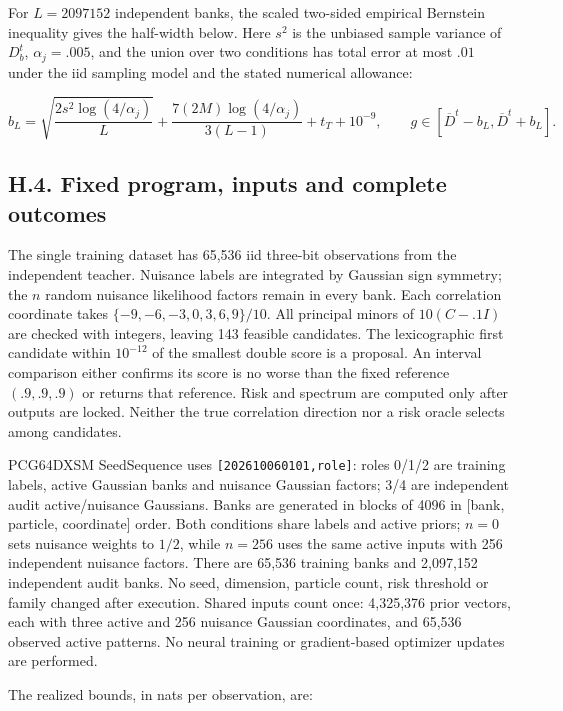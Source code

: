 \documentclass{article}
\begin{document}
For \(L=2097152\) independent banks, the scaled two-sided empirical
Bernstein inequality \citep[Theorem 4]{maurer2009} gives the half-width
below. Here \(s^2\) is the unbiased sample variance of \(D_b^t\),
\(\alpha_j=.005\), and the union over two conditions has total error at
most \(.01\) under the iid sampling model and the stated numerical
allowance:

\[
b_L=\sqrt{\frac{2s^2\log(4/\alpha_j)}{L}}
+\frac{7(2M)\log(4/\alpha_j)}{3(L-1)}+t_T+10^{-9},
\qquad g\in[\overline D^t-b_L,\overline D^t+b_L].
\tag{H.9}
\]

\subsection*{H.4. Fixed program, inputs and complete
outcomes}\label{h.4.-fixed-program-inputs-and-complete-outcomes}

The single training dataset has 65,536 iid three-bit observations from
the independent teacher. Nuisance labels are integrated by Gaussian sign
symmetry; the \(n\) random nuisance likelihood factors remain in every
bank. Each correlation coordinate takes \(\{-9,-6,-3,0,3,6,9\}/10\). All
principal minors of \(10(C-.1I)\) are checked with integers, leaving 143
feasible candidates. The lexicographic first candidate within
\(10^{-12}\) of the smallest double score is a proposal. An interval
comparison either confirms its score is no worse than the fixed
reference \((.9,.9,.9)\) or returns that reference. Risk and spectrum
are computed only after outputs are locked. Neither the true correlation
direction nor a risk oracle selects among candidates.

PCG64DXSM SeedSequence uses \texttt{{[}202610060101,role{]}}: roles
0/1/2 are training labels, active Gaussian banks and nuisance Gaussian
factors; 3/4 are independent audit active/nuisance Gaussians. Banks are
generated in blocks of 4096 in {[}bank, particle, coordinate{]} order.
Both conditions share labels and active priors; \(n=0\) sets nuisance
weights to \(1/2\), while \(n=256\) uses the same active inputs with 256
independent nuisance factors. There are 65,536 training banks and
2,097,152 independent audit banks. No seed, dimension, particle count,
risk threshold or family changed after execution. Shared inputs count
once: 4,325,376 prior vectors, each with three active and 256 nuisance
Gaussian coordinates, and 65,536 observed active patterns. No neural
training or gradient-based optimizer updates are performed.

The realized bounds, in nats per observation, are:
\end{document}

